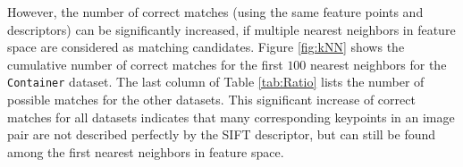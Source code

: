 
However, the number of correct matches (using the same feature points and descriptors) can be significantly increased, if multiple nearest neighbors in feature space are considered as matching candidates.
Figure \ref{fig:kNN} shows the cumulative number of correct matches for the first $100$ nearest neighbors for the \texttt{Container} dataset. 
The last column of Table \ref{tab:Ratio} lists the number of possible matches for the other datasets. 
This significant increase of correct matches for all datasets indicates that many corresponding keypoints in an image pair are not described perfectly by the SIFT descriptor, but can still be found among the first nearest neighbors in feature space.    

